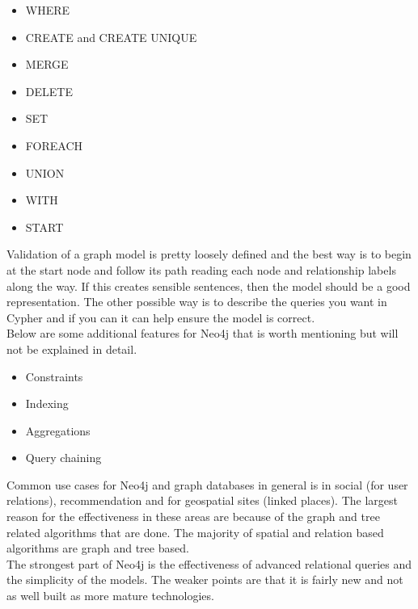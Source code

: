 \begin{itemize}
  \item WHERE
  \item CREATE and CREATE UNIQUE
  \item MERGE
  \item DELETE
  \item SET
  \item FOREACH
  \item UNION
  \item WITH
  \item START\\
\end{itemize}
Validation of a graph model is pretty loosely defined and the best way is to begin at the start node and follow its path reading each node and relationship labels along the way. If this creates sensible sentences, then the model should be a good representation. 
The other possible way is to describe the queries you want in Cypher and if you can it can help ensure the model is correct. 
\\[0.5cm]
Below are some additional features for Neo4j that is worth mentioning but will not be explained in detail.\
\begin{itemize}
  \item Constraints
  \item Indexing
  \item Aggregations
  \item Query chaining\\
\end{itemize}
Common use cases for Neo4j and graph databases in general is in social (for user relations), recommendation and for geospatial sites (linked places). The largest reason for the effectiveness in these areas are because of the graph and tree related algorithms that are done. The majority of spatial and relation based algorithms are graph and tree based. 
\\[0.5cm]
The strongest part of Neo4j is the effectiveness of advanced relational queries and the simplicity of the models. The weaker points are that it is fairly new and not as well built as more mature technologies. 



